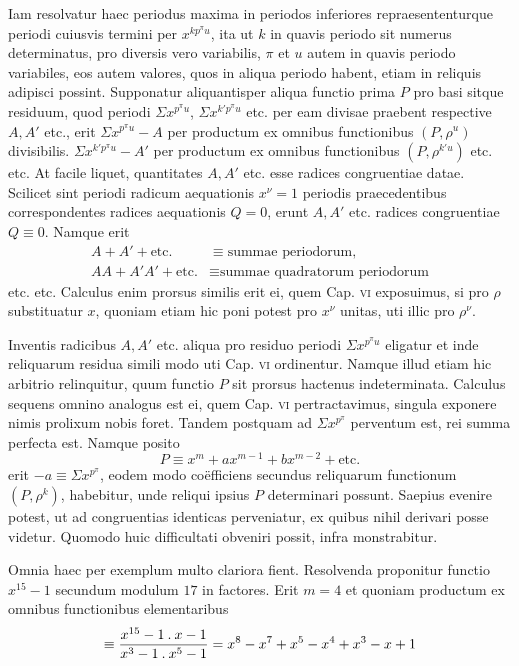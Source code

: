 Iam resolvatur haec periodus maxima in periodos inferiores repraesententurque periodi cuiusvis termini per $x^{kp^\pi u}$, ita ut $k$ in quavis periodo sit numerus
%
determinatus, pro diversis vero variabilis, $\pi$ et $u$ autem in quavis periodo variabiles, eos autem valores, quos in aliqua periodo habent, etiam in reliquis adipisci possint. Supponatur aliquantisper aliqua functio prima $P$ pro basi sitque residuum, quod periodi $\Sigma x^{p^\pi u}$, $\Sigma x^{k'p^\pi u}$ etc. per eam divisae praebent respective $A,A'$ etc., erit $\Sigma x^{p^\pi u}-A$ per productum ex omnibus functionibus $(P,\rho^u)$ divisibilis. $\Sigma x^{k'p^\pi u}-A'$ per productum ex omnibus functionibus $(P,\rho^{k'u})$ etc. etc. At facile liquet, quantitates $A,A'$ etc. esse radices congruentiae datae. Scilicet sint periodi radicum aequationis $x^\nu=1$ periodis praecedentibus correspondentes radices aequationis $Q=0$, erunt $A,A'$ etc. radices congruentiae $Q\equiv0$. Namque erit
\[
\begin{aligned}
A+A'+\text{etc.}&\equiv\text{summae periodorum},\\
AA+A'A'+\text{etc.}&\equiv\text{summae quadratorum periodorum}
\end{aligned}
\]
etc. etc. Calculus enim prorsus similis erit ei, quem Cap. \textsc{vi} exposuimus, si pro $\rho$ substituatur $x$, quoniam etiam hic poni potest pro $x^\nu$ unitas, uti illic pro $\rho^\nu$.

Inventis radicibus $A,A'$ etc. aliqua pro residuo periodi $\Sigma x^{p^\pi u}$ eligatur et inde reliquarum residua simili modo uti Cap. \textsc{vi} ordinentur. Namque illud etiam hic arbitrio relinquitur, quum functio $P$ sit prorsus hactenus indeterminata. Calculus sequens omnino analogus est ei, quem Cap. \textsc{vi} pertractavimus, singula exponere nimis prolixum nobis foret. Tandem postquam ad $\Sigma x^{p^\pi}$ perventum est, rei summa perfecta est. Namque posito
\[
P\equiv x^m+ax^{m-1}+bx^{m-2}+\text{etc.}
\]
erit $-a\equiv\Sigma x^{p^\pi}$, eodem modo coëfficiens secundus reliquarum functionum $(P,\rho^k)$, habebitur, unde reliqui ipsius $P$ determinari possunt. Saepius evenire potest, ut ad congruentias identicas perveniatur, ex quibus nihil derivari posse videtur. Quomodo huic difficultati obveniri possit, infra monstrabitur.

Omnia haec per exemplum multo clariora fient. Resolvenda proponitur functio $x^{15}-1$ secundum modulum $17$ in factores. Erit $m=4$ et quoniam productum ex omnibus functionibus elementaribus
\[
\equiv\frac{x^{15}-1\mathbin{.} x-1}{x^3-1\mathbin{.} x^5-1}=x^8-x^7+x^5-x^4+x^3-x+1
\]

